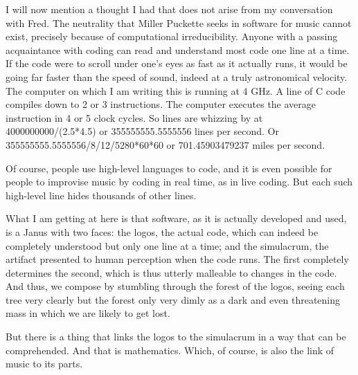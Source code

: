 \documentclass[a4paper,10pt]{article}
\begin{document}
I will now mention a thought I had that does not arise from my conversation with Fred. The neutrality that Miller Puckette seeks in software for music cannot exist, precisely because of computational irreducibility. Anyone with a passing acquaintance with coding can read and understand most code one line at a time. If the code were to scroll under one's eyes as fast as it actually runs, it would be going far faster than the speed of sound, indeed at a truly astronomical velocity. The computer on which I am writing this is running at 4 GHz. A line of C code compiles down to 2 or 3 instructions. The computer executes the average instruction in 4 or 5 clock cycles. So lines are whizzing by at 4000000000/(2.5*4.5) or 355555555.5555556 lines per second. Or 355555555.5555556/8/12/5280*60*60 or 701.45903479237 miles per second.

Of course, people use high-level languages to code, and it is even possible for people to improvise music by coding in real time, as in live coding. But each such high-level line hides thousands of other lines. 

What I am getting at here is that software, as it is actually developed and used, is a Janus with two faces: the logos, the actual code, which can indeed be completely understood but only one line at a time; and the simulacrum, the artifact presented to human perception when the code runs. The first completely determines the second, which is thus utterly malleable to changes in the code. And thus, we compose by stumbling through the forest of the logos, seeing each tree very clearly but the forest only very dimly as a dark and even threatening mass in which we are likely to get lost.

But there is a thing that links the logos to the simulacrum in a way that can be comprehended. And that is mathematics. Which, of course, is also the link of music to its parts.
\end{document}

